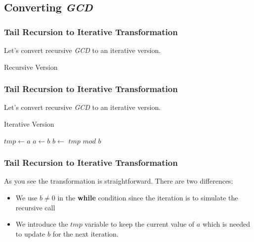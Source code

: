 \documentclass{beamer}
\begin{document}
\subsection{Converting \textit{GCD}}
\begin{frame}
	\frametitle{Tail Recursion to Iterative Transformation}
	Let's convert recursive \textit{GCD} to an iterative version.
	\begin{block}{Recursive Version}
				\begin{algorithmic}[1]
					\State{}
				\Else
					\State{}
				\EndIf
				\EndProcedure
			\end{algorithmic}
	\end{block}	
\end{frame}
\begin{frame}
	\frametitle{Tail Recursion to Iterative Transformation}
	Let's convert recursive \textit{GCD} to an iterative version.
	\begin{block}{Iterative Version}
				\begin{algorithmic}[1]
						\State $tmp \gets a$ 
						\State $a\gets b$
						\State $b \gets $ $tmp$ $mod$ $b$
					\EndWhile
					\State{}
				\EndProcedure
			\end{algorithmic}
	\end{block}	
\end{frame}
\begin{frame}
	\frametitle{Tail Recursion to Iterative Transformation}
	As you see the transformation is straightforward. There are two differences:
	\begin{itemize}
		\item We use $b\neq 0$ in the \textbf{while} condition since the iteration is to simulate the recursive call
		\item We introduce the $tmp$ variable to keep the current value of $a$ which is needed to update $b$ for the next iteration.
	\end{itemize}
\end{frame}
\end{document}
